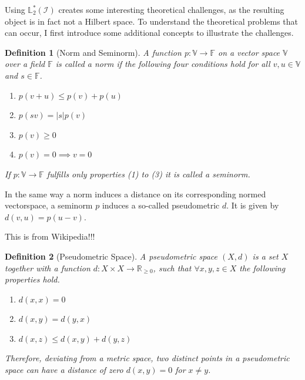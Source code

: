 \documentclass[12pt, a4paper]{article}
\theoremstyle{MAstyle} \newtheorem{assumption}{Assumption}[section]
\theoremstyle{MAstyle} \newtheorem{definition}{Definition}[section]
\theoremstyle{MAstyle} \newtheorem{theorem}{Theorem}[section]
\begin{document}
			Using $\mathbb{L}^{*}_2(\mathcal{I})$ creates some interesting theoretical challenges, as the resulting object is in fact not a Hilbert space. To understand the theoretical problems that can occur, I first introduce some additional concepts to illustrate the challenges.
			\begin{definition}[Norm and Seminorm]
				A function $p : \mathbb{V} \rightarrow \mathbb{F}$ on a vector space $\mathbb{V}$ over a field $\mathbb{F}$ is called a norm if the following four conditions hold for all $v,u \in \mathbb{V}$ and $s \in \mathbb{F}$.
				\begin{multicols}{2}
					\begin{enumerate}
						\item $p(v + u) \leq p(v) + p(u)$
						\item $p(sv) = |s| p(v)$
						\item $p(v) \geq 0$
						\item $p(v) = 0 \implies v = 0$
					\end{enumerate}
				\end{multicols}
				If $p : \mathbb{V} \rightarrow \mathbb{F}$ fulfills only properties (1) to (3) it is called a seminorm.
			\end{definition}
			
			In the same way a norm induces a distance on its corresponding normed vectorspace, a seminorm $p$ induces a so-called pseudometric $d$. It is given by $d(v,u) = p(u-v)$.
			
			{\color{red} This is from Wikipedia!!!}
			\begin{definition}[Pseudometric Space]
				A pseudometric space $\left(X, d\right)$ is a set $X$ together with a function $d:X\times X \rightarrow \mathbb{R}_{\geq 0}$, such that $\forall x,y,z \in X$ the following properties hold.
				\begin{multicols}{2}
					\begin{enumerate}
						\item $d(x,x) = 0$
						\item $d(x,y) = d(y,x)$
						\item $d(x,z) \leq d(x,y) + d(y,z)$
					\end{enumerate}
				\end{multicols}
				Therefore, deviating from a metric space, two distinct points in a pseudometric space can have a distance of zero $d(x,y) = 0$ for $x \neq y$.
			\end{definition}
			
\end{document}
